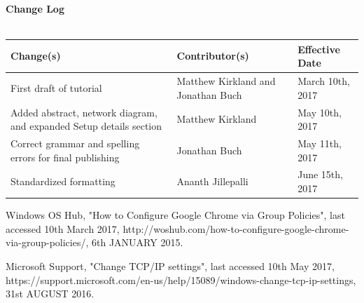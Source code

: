 \documentclass[12pt]{extarticle}
\begin{document}
\pagebreak
\textbf{Change Log}\\\\
\label{changelog}

\begin{tabular}{| C{5cm} | C{5cm} | C{5cm} |}
\hline
\textbf{Change(s)} & \textbf{Contributor(s)} & \textbf{Effective Date} \\
\hline
First draft of tutorial & Matthew Kirkland and Jonathan Buch & March 10th, 2017 \\
\hline
Added abstract, network diagram, and expanded Setup details section & Matthew Kirkland & May 10th, 2017 \\
\hline
Correct grammar and spelling errors for final publishing & Jonathan Buch & May 11th, 2017 \\
\hline
Standardized formatting & Ananth Jillepalli & June 15th, 2017 \\
\hline
\end{tabular}

\pagebreak


\begin{thebibliography}{99}


Windows OS Hub, "How to Configure Google Chrome via Group Policies", last accessed 10th March 2017, http://woshub.com/how-to-configure-google-chrome-via-group-policies/, 6th JANUARY 2015.


Microsoft Support, "Change TCP/IP settings", last accessed 10th May 2017, https://support.microsoft.com/en-us/help/15089/windows-change-tcp-ip-settings, 31st AUGUST 2016.

\end{thebibliography}
\end{document}
